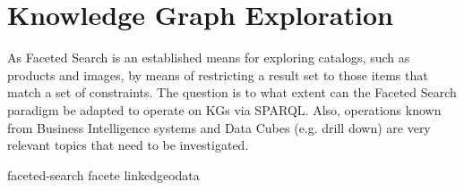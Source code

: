 \chapter{Knowledge Graph Exploration}
As Faceted Search is an established means for exploring catalogs, such as products and images,
by means of restricting a result set to those items that match a set of constraints.
The question is to what extent can the Faceted Search paradigm be adapted to operate on KGs via SPARQL.
Also, operations known from Business Intelligence systems and Data Cubes (e.g. drill down) are very relevant topics
that need to be investigated.

{faceted-search}
{facete}
{linkedgeodata}
